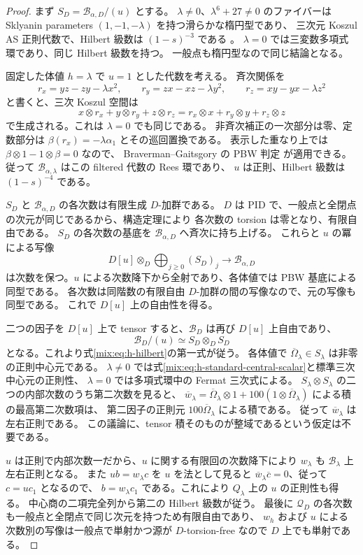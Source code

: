 \begin{proof}
まず $S_D=\mathscr B_{\alpha,D}/(u)$ とする。
$\lambda\ne0$、$\lambda^6+27\ne0$ のファイバーは
Sklyanin parameters $(1,-1,-\lambda)$ を持つ滑らかな楕円型であり、
三次元 Koszul AS 正則代数で、Hilbert 級数は $(1-s)^{-3}$ である
\cite[Section~1]{GRSklyaninST}\cite[Theorem~1.1, Corollary~1.3]{GRSklyaninTV}。
$\lambda=0$ では三変数多項式環であり、同じ Hilbert 級数を持つ。
一般点も楕円型なので同じ結論となる。

固定した体値 $h=\lambda$ で $u=1$ とした代数を考える。
斉次関係を
\[
 r_x=yz-zy-\lambda x^2,\qquad r_y=zx-xz-\lambda y^2,
 \qquad r_z=xy-yx-\lambda z^2
\]
と書くと、三次 Koszul 空間は
\[
 x\otimes r_x+y\otimes r_y+z\otimes r_z
 =r_x\otimes x+r_y\otimes y+r_z\otimes z
\]
で生成される。これは $\lambda=0$ でも同じである。
非斉次補正の一次部分は零、定数部分は
$\beta(r_x)=-\lambda\alpha_1$ とその巡回置換である。
表示した重なり上では
$\beta\otimes1-1\otimes\beta=0$ なので、
Braverman--Gaitsgory の PBW 判定
\cite[Main Theorem~0.5, Lemma~3.3]{CMOBravermanGaitsgory}が適用できる。
従って $\mathscr B_{\alpha,\lambda}$ はこの filtered 代数の Rees 環であり、
$u$ は正則、Hilbert 級数は $(1-s)^{-4}$ である。

$S_D$ と $\mathscr B_{\alpha,D}$ の各次数は有限生成 $D$-加群である。
$D$ は PID で、一般点と全閉点の次元が同じであるから、構造定理により
各次数の torsion は零となり、有限自由である。
$S_D$ の各次数の基底を $\mathscr B_{\alpha,D}$ へ斉次に持ち上げる。
これらと $u$ の冪による写像
\[
 D[u]\otimes_D\bigoplus_{j\ge0}(S_D)_j
 \longrightarrow\mathscr B_{\alpha,D}
\]
は次数を保つ。$u$ による次数降下から全射であり、各体値では PBW 基底による同型である。
各次数は同階数の有限自由 $D$-加群の間の写像なので、元の写像も同型である。
これで $D[u]$ 上の自由性を得る。

二つの因子を $D[u]$ 上で tensor すると、$\mathscr B_D$ は再び $D[u]$ 上自由であり、
\[
 \mathscr B_D/(u)\simeq S_D\otimes_D S_D
\]
となる。これより式\eqref{mix:eq:h-hilbert}の第一式が従う。
各体値で $\overline\Omega_\lambda\in S_\lambda$ は非零の正則中心元である。
$\lambda\ne0$ では式\eqref{mix:eq:h-standard-central-scalar}と標準三次中心元の正則性、
$\lambda=0$ では多項式環中の Fermat 三次式による。
$S_\lambda\otimes S_\lambda$ の二つの内部次数のうち第二次数を見ると、
$\overline w_\lambda=\overline\Omega_\lambda\otimes1+
100(1\otimes\overline\Omega_\lambda)$ による積の最高第二次数項は、
第二因子の正則元 $100\overline\Omega_\lambda$ による積である。
従って $\overline w_\lambda$ は左右正則である。
この議論に、tensor 積そのものが整域であるという仮定は不要である。

$u$ は正則で内部次数一だから、$u$ に関する有限回の次数降下により
$w_\lambda$ も $\mathscr B_\lambda$ 上左右正則となる。
また $u b=w_\lambda c$ を $u$ を法として見ると
$\overline w_\lambda\overline c=0$、従って $c=uc_1$ となるので、
$b=w_\lambda c_1$ である。これにより $Q_\lambda$ 上の $u$ の正則性も得る。
中心商の二項完全列から第二の Hilbert 級数が従う。
最後に $\mathscr Q_D$ の各次数も一般点と全閉点で同じ次元を持つため有限自由であり、
$w_h$ および $u$ による次数別の写像は一般点で単射かつ源が $D$-torsion-free
なので $D$ 上でも単射である。
\end{proof}

